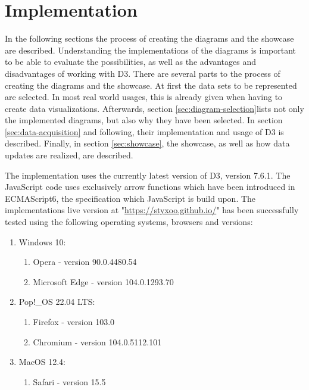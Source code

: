 \chapter{Implementation}\label{sec:implementation}


In the following sections the process of creating the diagrams and the showcase are described. Understanding the implementations of the diagrams is important to be able to evaluate the possibilities, as well as the advantages and disadvantages of working with D3.
There are several parts to the process of creating the diagrams and the showcase. At first the data sets to be represented are selected. In most real world usages, this is already given when having to create data visualizations. Afterwards, section \ref{sec:diagram-selection}lists not only the implemented diagrams, but also why they have been selected. In section \ref{sec:data-acquisition} and following, their implementation and usage of D3 is described. Finally, in section \ref{sec:showcase}, the showcase, as well as how data updates are realized, are described.

The implementation uses the currently latest version of D3, version 7.6.1. The JavaScript code uses exclusively arrow functions which have been introduced in ECMAScript6, the specification which JavaScript is build upon\cite{ecmascript}. The implementations live version at "\url{https://styxoo.github.io/}" has been successfully tested using the following operating systems, browsers and versions:
\begin{enumerate}
    \item Windows 10:
    \begin{enumerate}
        \item Opera - version 90.0.4480.54
        \item Microsoft Edge - version 104.0.1293.70
    \end{enumerate}
    \item Pop!\_OS 22.04 LTS:
    \begin{enumerate}
        \item Firefox - version 103.0
        \item Chromium - version 104.0.5112.101
    \end{enumerate}
    \item MacOS 12.4:
    \begin{enumerate}
        \item Safari - version 15.5
    \end{enumerate}
\end{enumerate}

